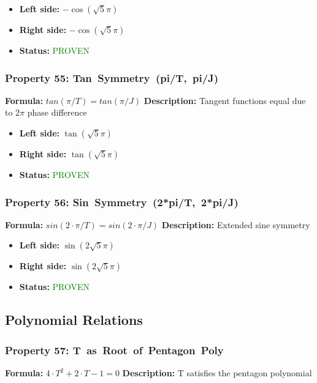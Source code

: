 \begin{itemize}
\item \textbf{Left side:} $- \cos{\left(\sqrt{5} \pi \right)}$
\item \textbf{Right side:} $- \cos{\left(\sqrt{5} \pi \right)}$
\item \textbf{Status:} \textcolor{green}{PROVEN}
\end{itemize}

\subsubsection*{Property 55: Tan~Symmetry~(pi/T,~pi/J)}
\textbf{Formula:} $tan(\pi/T) = tan(\pi/J)$
\textbf{Description:} Tangent functions equal due to 2$\pi$ phase difference

\begin{itemize}
\item \textbf{Left side:} $\tan{\left(\sqrt{5} \pi \right)}$
\item \textbf{Right side:} $\tan{\left(\sqrt{5} \pi \right)}$
\item \textbf{Status:} \textcolor{green}{PROVEN}
\end{itemize}

\subsubsection*{Property 56: Sin~Symmetry~(2*pi/T,~2*pi/J)}
\textbf{Formula:} $sin(2 \cdot \pi/T) = sin(2 \cdot \pi/J)$
\textbf{Description:} Extended sine symmetry

\begin{itemize}
\item \textbf{Left side:} $\sin{\left(2 \sqrt{5} \pi \right)}$
\item \textbf{Right side:} $\sin{\left(2 \sqrt{5} \pi \right)}$
\item \textbf{Status:} \textcolor{green}{PROVEN}
\end{itemize}


\subsection{Polynomial Relations}

\subsubsection*{Property 57: T~as~Root~of~Pentagon~Poly}
\textbf{Formula:} $4 \cdot T^2 + 2 \cdot T - 1 = 0$
\textbf{Description:} T satisfies the pentagon polynomial

